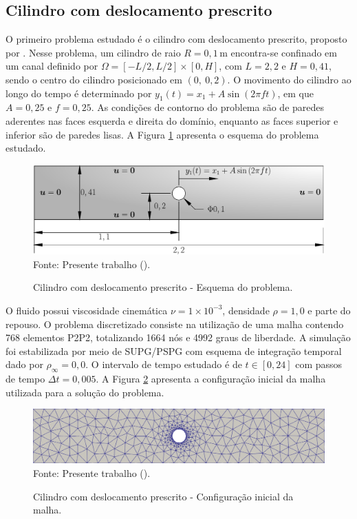 \subsection{Cilindro com deslocamento prescrito}

O primeiro problema estudado é o cilindro com deslocamento prescrito, proposto por . Nesse problema, um cilindro de raio $R=0,1\,\mathrm{m}$ encontra-se confinado em um canal definido por $\Omega=[-L/2, L/2]\times[0,H]$, com $L=2,2$ e $H=0,41$, sendo o centro do cilindro posicionado em $(0,\ 0,2)$. O movimento do cilindro ao longo do tempo é determinado por $y_1(t)=x_1+A\sin{(2\pi f t)}$, em que $A=0,25$ e $f=0,25$. As condições de contorno do problema são de paredes aderentes nas faces esquerda e direita do domínio, enquanto as faces superior e inferior são de paredes lisas. A Figura \ref{fig:moving-cylinder} apresenta o esquema do problema estudado.

\begin{figure}[h!]
    \centering
    \caption{Cilindro com deslocamento prescrito - Esquema do problema.}
    \includegraphics[width=.7\linewidth]{Figuras/moving-cylinder/moving-cilinder.pdf}
    \\Fonte: Presente trabalho (\the\year).
    \label{fig:moving-cylinder}
\end{figure}

O fluido possui viscosidade cinemática $\nu=1\times10^{-3}$, densidade $\rho=1,0$ e parte do repouso. O problema discretizado consiste na utilização de uma malha contendo 768 elementos P2P2, totalizando 1664 nós e 4992 graus de liberdade. A simulação foi estabilizada por meio de SUPG/PSPG com esquema de integração temporal dado por $\rho_\infty=0,0$. O intervalo de tempo estudado é de $t\in[0,24]$ com passos de tempo $\Delta t=0,005$. A Figura \ref{fig:moving-cylinder-mesh} apresenta a configuração inicial da malha utilizada para a solução do problema.

\begin{figure}[h!]
    \centering
    \caption{Cilindro com deslocamento prescrito - Configuração inicial da malha.}
    \includegraphics[width=\linewidth]{Figuras/moving-cylinder/mesh1.png}
    \\Fonte: Presente trabalho (\the\year).
    \label{fig:moving-cylinder-mesh}
\end{figure}

